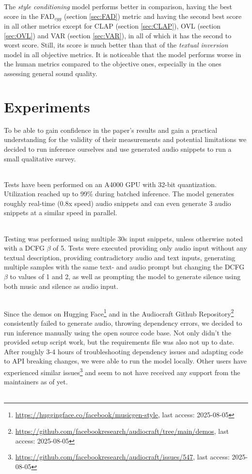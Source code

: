 \documentclass[a4paper,12pt,twoside]{article}
\begin{document}
The \textit{style conditioning} model performs better in comparison, having the best score in the FAD$_{vgg}$ (section \ref{sec:FAD}) metric and having the second best score in all other metrics except for CLAP (section \ref{sec:CLAP}), OVL (section \ref{sec:OVL}) and VAR (section \ref{sec:VAR}), in all of which it has the second to worst score. Still, its score is much better than that of the \textit{textual inversion} model in all objective metrics. It is noticeable that the model performs worse in the human metrics compared to the objective ones, especially in the ones assessing general sound quality.

\section{Experiments}\label{sec:experiments}

To be able to gain confidence in the paper's results and gain a practical understanding for the validity of their measurements and potential limitations we decided to run inference ourselves and use generated audio snippets to run a small qualitative survey.\\ \

Tests have been performed on an A4000 GPU with 32-bit quantization. Utilization reached up to 99\% during batched inference. The model generates roughly real-time (0.8x speed) audio snippets and can even generate 3 audio snippets at a similar speed in parallel.\\ \

Testing was performed using multiple 30s input snippets, unless otherwise noted with a DCFG $\beta$ of 5. Tests were executed providing only audio input without any textual description, providing contradictory audio and text inputs, generating multiple samples with the same text- and audio prompt but changing the DCFG $\beta$ to values of 1 and 2, as well as prompting the model to generate silence using both music and silence as audio input. \\ \

Since the demos on Hugging Face\footnote{\url{https://huggingface.co/facebook/musicgen-style}, last access: 2025-08-05} and in the Audiocraft Github Repository\footnote{\url{https://github.com/facebookresearch/audiocraft/tree/main/demos}, last access: 2025-08-05} consistently failed to generate audio, throwing dependency errors, we decided to run inference manually using the open source code base. Not only didn't the provided setup script work, but the requirements file was also not up to date. After roughly 3-4 hours of troubleshooting dependency issues and adapting code to API breaking changes, we were able to run the model locally. Other users have experienced similar issues\footnote{\url{https://github.com/facebookresearch/audiocraft/issues/547}, last access: 2025-08-05} and seem to not have received any support from the maintainers as of yet.\\ \
\end{document}
